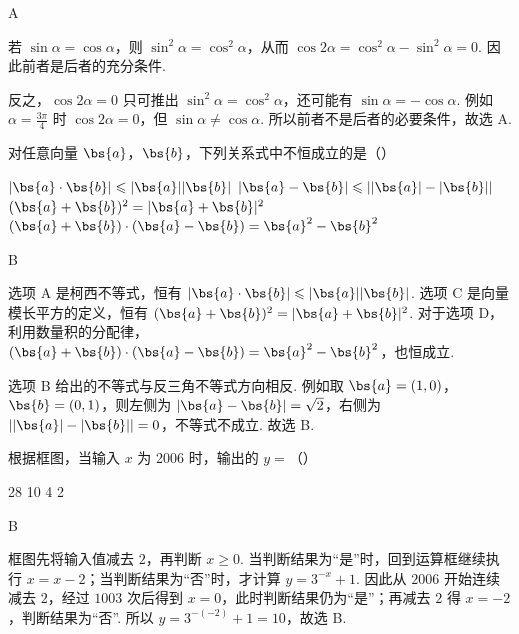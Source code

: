 \begin{answer}
A
\end{answer}

\begin{solution}
若 \(\sin\alpha=\cos\alpha\)，则 \(\sin^{2}\alpha=\cos^{2}\alpha\)，从而 \(\cos2\alpha=\cos^{2}\alpha-\sin^{2}\alpha=0\). 因此前者是后者的充分条件.

反之，\(\cos2\alpha=0\) 只可推出 \(\sin^{2}\alpha=\cos^{2}\alpha\)，还可能有 \(\sin\alpha=-\cos\alpha\). 例如 \(\alpha=\frac{3\pi}{4}\) 时 \(\cos2\alpha=0\)，但 \(\sin\alpha\ne\cos\alpha\). 所以前者不是后者的必要条件，故选 A.
\end{solution}

\begin{problem}
对任意向量 \(\bs{a}\)，\(\bs{b}\)，下列关系式中不恒成立的是（\quad）

\choices
    {\( |\bs{a} \cdot \bs{b}| \leqslant |\bs{a}||\bs{b}| \)}
    {\( |\bs{a} - \bs{b}| \leqslant ||\bs{a}| - |\bs{b}|| \)}
    {\((\bs{a} + \bs{b})^2 = |\bs{a} + \bs{b}|^2\)}
    {\((\bs{a} + \bs{b}) \cdot (\bs{a} - \bs{b}) = \bs{a}^2 - \bs{b}^2\)}
\end{problem}

\begin{answer}
B
\end{answer}

\begin{solution}
选项 A 是柯西不等式，恒有 \(|\bs{a}\cdot\bs{b}|\leqslant|\bs{a}||\bs{b}|\). 选项 C 是向量模长平方的定义，恒有 \((\bs{a}+\bs{b})^{2}=|\bs{a}+\bs{b}|^{2}\). 对于选项 D，利用数量积的分配律，
\((\bs{a}+\bs{b})\cdot(\bs{a}-\bs{b})=\bs{a}^{2}-\bs{b}^{2}\)，也恒成立.

选项 B 给出的不等式与反三角不等式方向相反. 例如取 \(\bs{a}=(1,0)\)，\(\bs{b}=(0,1)\)，则左侧为 \(|\bs{a}-\bs{b}|=\sqrt{2}\)，右侧为 \(||\bs{a}|-|\bs{b}||=0\)，不等式不成立. 故选 B.
\end{solution}

\begin{problem}
根据框图，当输入 \(x\) 为 2006 时，输出的 \(y =\)（\quad）


\choices
    {28}
    {10}
    {4}
    {2}
\end{problem}

\begin{answer}
B
\end{answer}

\begin{solution}
框图先将输入值减去 \(2\)，再判断 \(x\geqslant0\). 当判断结果为“是”时，回到运算框继续执行 \(x=x-2\)；当判断结果为“否”时，才计算 \(y=3^{-x}+1\). 因此从 \(2006\) 开始连续减去 \(2\)，经过 \(1003\) 次后得到 \(x=0\)，此时判断结果仍为“是”；再减去 \(2\) 得 \(x=-2\)，判断结果为“否”. 所以 \(y=3^{-(-2)}+1=10\)，故选 B.
\end{solution}

